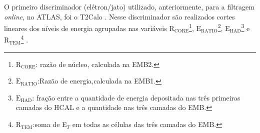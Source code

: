 

%

O primeiro discriminador (elétron/jato) utilizado, anteriormente, para a filtragem \textit{online}, no ATLAS, foi o T2Calo \cite{T2Calo2003}. Nesse discriminador são realizados cortes lineares dos níveis de energia agrupadas nas variáveis $\mathrm{R_{CORE}}$\footnote{$\mathrm{R_{CORE}}$: razão de núcleo, calculada na EMB2.}, $\mathrm{E_{RATIO}}$\footnote{$\mathrm{E_{RATIO}}$:Razão de energia,calculada na EMB1.}, $\mathrm{E_{HAD}}$\footnote{$\mathrm{E_{HAD}}$: fração entre a quantidade de energia depositada nas três primeiras camadas do HCAL e a quantidade nas três camadas do EMB.} e $\mathrm{R_{TEM}}$\footnote{$\mathrm{R_{TEM}}$:soma de E$_T$ em todas as células das três camadas do EMB.} \cite{thesis:ciodaro2012}. 


